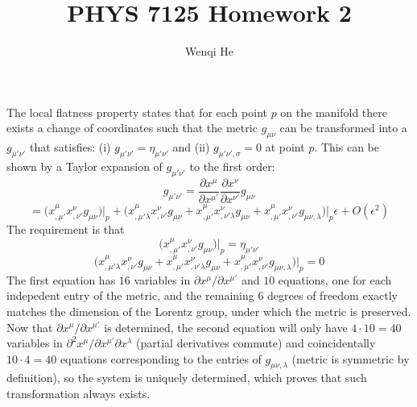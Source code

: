 \documentclass{article}
\title{PHYS 7125 Homework 2}
\author{Wenqi He}
\begin{document}
\maketitle
\section{}
The local flatness property states that for each point $p$ on the manifold there exists a change of coordinates such that the metric $g_{\mu\nu}$ can be transformed into a $g_{\mu'\nu'}$ that satisfies: (i) $g_{\mu'\nu'} = \eta_{\mu'\nu'}$ and (ii) $g_{\mu'\nu',\sigma} = 0$ at point $p$. This can be shown by a Taylor expansion of $g_{\mu'\nu'}$ to the first order:
\[ g_{\mu'\nu'} = \frac{\partial x^\mu}{\partial x^{\mu'}}\frac{\partial x^\nu}{\partial x^{\nu'}} g_{\mu\nu} \]
\[ = \Big(x^\mu_{,\mu'} x^\nu_{,\nu'} g_{\mu\nu}\Big)\Big\rvert_p
	+ \Bigg( x^\mu_{,\mu'\lambda} x^\nu_{,\nu'} g_{\mu\nu}
	+ x^\mu_{,\mu'}x^\nu_{,\nu'\lambda}g_{\mu\nu}
	+ x^\mu_{,\mu'}x^\nu_{,\nu'} g_{\mu\nu,\lambda}\Bigg)\Big\rvert_p \epsilon + O(\epsilon^2) \]
The requirement is that 
\[ \Big(x^\mu_{,\mu'} x^\nu_{,\nu'} g_{\mu\nu}\Big)\Big\rvert_p = \eta_{\mu'\nu'} \]
\[ \Bigg( x^\mu_{,\mu'\lambda} x^\nu_{,\nu'} g_{\mu\nu}
	+ x^\mu_{,\mu'}x^\nu_{,\nu'\lambda}g_{\mu\nu}
	+ x^\mu_{,\mu'}x^\nu_{,\nu'} g_{\mu\nu,\lambda}\Bigg)\Big\rvert_p = 0 \]
The first equation has $16$ variables in $\partial x^\mu/\partial x^{\mu'}$ and $10$ equations, one for each indepedent entry of the metric, and the remaining 6 degrees of freedom exactly matches the dimension of the Lorentz group, under which the metric is preserved. Now that $\partial x^\mu/\partial x^{\mu'}$ is determined, the second equation will only have $4 \cdot 10 = 40$ variables in $\partial^2x^\mu/\partial x^{\mu'}\partial x^\lambda$ (partial derivatives commute) and coincidentally $10 \cdot 4 = 40$ equations corresponding to the entries of $g_{\mu\nu,\lambda}$ (metric is symmetric by definition), so the system is uniquely determined, which proves that such transformation always exists.

\section{}
\end{document}
